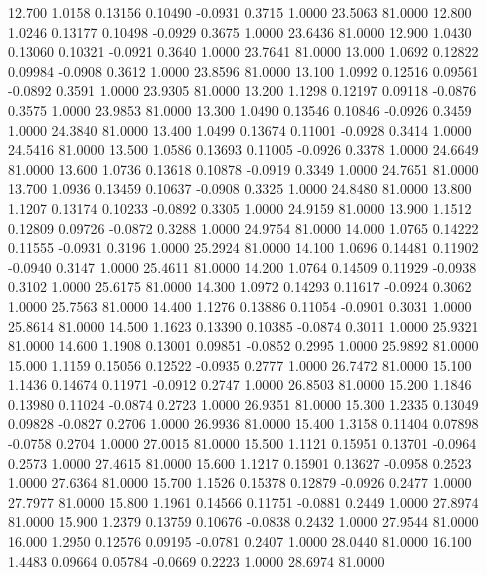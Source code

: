   12.700   1.0158   0.13156   0.10490  -0.0931   0.3715   1.0000  23.5063  81.0000
  12.800   1.0246   0.13177   0.10498  -0.0929   0.3675   1.0000  23.6436  81.0000
  12.900   1.0430   0.13060   0.10321  -0.0921   0.3640   1.0000  23.7641  81.0000
  13.000   1.0692   0.12822   0.09984  -0.0908   0.3612   1.0000  23.8596  81.0000
  13.100   1.0992   0.12516   0.09561  -0.0892   0.3591   1.0000  23.9305  81.0000
  13.200   1.1298   0.12197   0.09118  -0.0876   0.3575   1.0000  23.9853  81.0000
  13.300   1.0490   0.13546   0.10846  -0.0926   0.3459   1.0000  24.3840  81.0000
  13.400   1.0499   0.13674   0.11001  -0.0928   0.3414   1.0000  24.5416  81.0000
  13.500   1.0586   0.13693   0.11005  -0.0926   0.3378   1.0000  24.6649  81.0000
  13.600   1.0736   0.13618   0.10878  -0.0919   0.3349   1.0000  24.7651  81.0000
  13.700   1.0936   0.13459   0.10637  -0.0908   0.3325   1.0000  24.8480  81.0000
  13.800   1.1207   0.13174   0.10233  -0.0892   0.3305   1.0000  24.9159  81.0000
  13.900   1.1512   0.12809   0.09726  -0.0872   0.3288   1.0000  24.9754  81.0000
  14.000   1.0765   0.14222   0.11555  -0.0931   0.3196   1.0000  25.2924  81.0000
  14.100   1.0696   0.14481   0.11902  -0.0940   0.3147   1.0000  25.4611  81.0000
  14.200   1.0764   0.14509   0.11929  -0.0938   0.3102   1.0000  25.6175  81.0000
  14.300   1.0972   0.14293   0.11617  -0.0924   0.3062   1.0000  25.7563  81.0000
  14.400   1.1276   0.13886   0.11054  -0.0901   0.3031   1.0000  25.8614  81.0000
  14.500   1.1623   0.13390   0.10385  -0.0874   0.3011   1.0000  25.9321  81.0000
  14.600   1.1908   0.13001   0.09851  -0.0852   0.2995   1.0000  25.9892  81.0000
  15.000   1.1159   0.15056   0.12522  -0.0935   0.2777   1.0000  26.7472  81.0000
  15.100   1.1436   0.14674   0.11971  -0.0912   0.2747   1.0000  26.8503  81.0000
  15.200   1.1846   0.13980   0.11024  -0.0874   0.2723   1.0000  26.9351  81.0000
  15.300   1.2335   0.13049   0.09828  -0.0827   0.2706   1.0000  26.9936  81.0000
  15.400   1.3158   0.11404   0.07898  -0.0758   0.2704   1.0000  27.0015  81.0000
  15.500   1.1121   0.15951   0.13701  -0.0964   0.2573   1.0000  27.4615  81.0000
  15.600   1.1217   0.15901   0.13627  -0.0958   0.2523   1.0000  27.6364  81.0000
  15.700   1.1526   0.15378   0.12879  -0.0926   0.2477   1.0000  27.7977  81.0000
  15.800   1.1961   0.14566   0.11751  -0.0881   0.2449   1.0000  27.8974  81.0000
  15.900   1.2379   0.13759   0.10676  -0.0838   0.2432   1.0000  27.9544  81.0000
  16.000   1.2950   0.12576   0.09195  -0.0781   0.2407   1.0000  28.0440  81.0000
  16.100   1.4483   0.09664   0.05784  -0.0669   0.2223   1.0000  28.6974  81.0000
